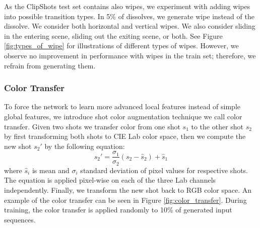 As the ClipShots test set contains also wipes, we experiment with adding wipes into possible transition types. In 5\% of dissolves, we generate wipe instead of the dissolve. We consider both horizontal and vertical wipes. We also consider sliding in the entering scene, sliding out the exiting scene, or both. See Figure \ref{fig:types_of_wipe} for illustrations of different types of wipes. However, we observe no improvement in performance with wipes in the train set; therefore, we refrain from generating them.

\subsubsection{Color Transfer}
To force the network to learn more advanced local features instead of simple global features, we introduce shot color augmentation technique we call color transfer. Given two shots we transfer color from one shot $s_1$ to the other shot $s_2$ by first transforming both shots to CIE Lab color space, then we compute the new shot $s_2'$ by the following equation:
\begin{equation*}
    s_2' = \frac{\sigma_1}{\sigma_2} (s_2 - \hat{s}_2) + \hat{s}_1
\end{equation*}
where $\hat{s}_i$ is mean and $\sigma_i$ standard deviation of pixel values for respective shots. The equation is applied pixel-wise on each of the three Lab channels independently. Finally, we transform the new shot back to RGB color space. An example of the color transfer can be seen in Figure \ref{fig:color_transfer}. During training, the color transfer is applied randomly to 10\% of generated input sequences.


